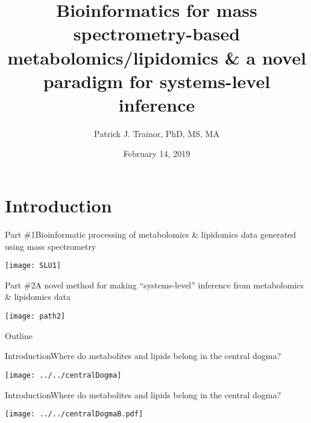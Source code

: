 \documentclass[xcolor=dvipsnames]{beamer}
\begin{document}
	
\title[Bioinformatics for MS and Systems Inference]{{\bf Bioinformatics for mass spectrometry-based metabolomics/lipidomics \& a novel paradigm for systems-level inference}}
\author[P.J. Trainor]{Patrick J. Trainor, PhD, MS, MA}
{

}
\date[February 2019]{February 14, 2019}

\begin{frame}
	\titlepage
\end{frame}

\section{Introduction}

\begin{frame}{Part \#1}{Bioinformatic processing of metabolomics \& lipidomics data generated using mass spectrometry}
\vspace{-15pt}
\begin{center}
	\texttt{[image: SLU1]}
\end{center}
\end{frame}

\begin{frame}{Part \#2}{A novel method for making ``systems-level'' inference from metabolomics \& lipidomics data}
\vspace{-15pt}
\begin{center}
\texttt{[image: path2]}
\end{center}
\end{frame}

\begin{frame}{Outline}
\vspace{-10.5pt}
\tableofcontents[currentsection,subsectionstyle=hide]
\end{frame}

\begin{frame}{Introduction}{Where do metabolites and lipids belong in the central dogma?}
\vspace{-7 pt}
\begin{center}
		\texttt{[image: ../../centralDogma]}
	\end{center}
\end{frame}

\begin{frame}{Introduction}{Where do metabolites and lipids belong in the central dogma?}
\vspace{-7 pt}
\begin{center}
	\texttt{[image: ../../centralDogmaB.pdf]}
\end{center}
\end{frame}
\end{document}
